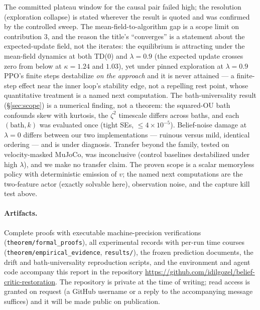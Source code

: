 \documentclass[11pt]{article}
\begin{document}
The committed plateau window for the causal pair failed high; the resolution (exploration
collapse) is stated wherever the result is quoted and was confirmed by the controlled sweep.
The mean-field-to-algorithm gap is a scope limit on contribution 3, and the reason the title's
``converges'' is a statement about the expected-update field, not the iterates: the equilibrium
is attracting under the mean-field dynamics at both TD(0) and $\lambda = 0.9$ (the expected
update crosses zero from below at $\kappa = 1.24$ and $1.03$), yet under pinned exploration at
$\lambda = 0.9$ PPO's finite steps destabilize \emph{on the approach} and it is never attained
--- a finite-step effect near the inner loop's stability edge, not a repelling rest point, whose
quantitative treatment is a named next computation. The bath-universality result
(\S\ref{sec:scope}) is a numerical finding, not a theorem: the squared-OU bath confounds skew
with kurtosis, the $\zeta^2$ timescale differs across baths, and each $(\text{bath},k)$ was
evaluated once (tight SEs, $\le 4\times10^{-5}$). Belief-noise damage at $\lambda = 0$ differs
between our two implementations --- ruinous versus mild, identical ordering --- and is under
diagnosis. Transfer beyond the family, tested on velocity-masked MuJoCo, was inconclusive
(control baselines destabilized under high $\lambda$), and we make no transfer claim. The proven
scope is a scalar memoryless policy with deterministic emission of $v$; the named next
computations are the two-feature actor (exactly solvable here), observation noise, and the
capture kill test above.

\paragraph{Artifacts.} Complete proofs with executable machine-precision verifications
(\texttt{theorem/formal\_proofs}), all experimental records with per-run time courses
(\texttt{theorem/empirical\_evidence}, \texttt{results/}), the frozen prediction documents,
the drift and bath-universality reproduction scripts, and the environment and agent code
accompany this report in the repository
\url{https://github.com/idilgozel/belief-critic-restoration}. The repository is
private at the time of writing; read access is granted on request (a GitHub username or a reply
to the accompanying message suffices) and it will be made public on publication.
\end{document}
